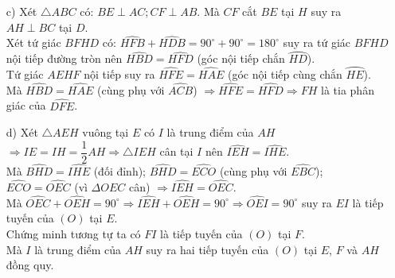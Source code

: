 \begin{ex}
{{
}
\begin{enumerate}
\item[c)] Xét  $\triangle ABC$  có:  $BE \perp AC; CF \perp AB$. Mà  $CF$ cắt  $BE$  tại  $H$ suy ra $AH \perp BC$  tại  $D$.\\
 Xét tứ giác  $BFHD$  có:  $\widehat {HFB} + \widehat {HDB} = 90^\circ + 90^\circ = 180^\circ$  suy ra tứ giác  $BFHD$ nội tiếp đường tròn nên $ \widehat {HBD} = \widehat {HFD}$  (góc nội tiếp chắn $\wideparen{HD}$).\\
Tứ giác  $AEHF$ nội tiếp suy ra  $\widehat {HFE} = \widehat {HAE}$  (góc nội tiếp cùng chắn $\wideparen{HE}$).\\
Mà  $\widehat {HBD} = \widehat {HAE}$  (cùng phụ với  $\widehat {ACB}$) $\Rightarrow  \widehat {HFE} = \widehat {HFD} \Rightarrow FH$  là tia phân giác của  $\widehat {DFE}$.
\item[d)] Xét  $\triangle AEH$  vuông tại  $E$  có $I$ là trung điểm của  $AH$ 
 $\Rightarrow  IE = IH=\dfrac{1}{2}AH \Rightarrow  \triangle IEH$ cân tại  $I$ nên $\widehat {IEH} = \widehat {IHE}$.\\ 
Mà   $\widehat {BHD} = \widehat {IHE}$ (đối đỉnh);  $\widehat {BHD} = \widehat {ECO}$  (cùng phụ với  $\widehat {EBC}$);  $\widehat {ECO} = \widehat {OEC}$  (vì $\Delta OEC$ cân) $\Rightarrow  \widehat {IEH} = \widehat {OEC}$.\\
 Mà  $\widehat {OEC} + \widehat {OEH} = 90^\circ \Rightarrow \widehat {IEH} + \widehat {OEH} = 90^\circ \Rightarrow \widehat {OEI} = 90^\circ$ suy ra $EI$  là tiếp tuyến của  $\left( O \right)$  tại  $E$.\\
Chứng minh tương tự ta có   $FI$  là tiếp tuyến của  $\left( O \right)$  tại  $F$.\\
Mà  $I$ là trung điểm của  $AH$  suy ra hai tiếp tuyến của $\left( O \right)$ tại $E$, $F$  và $AH$  đồng quy.
\end{enumerate}
}
\end{ex}

